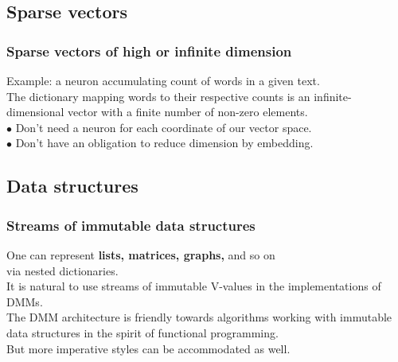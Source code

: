 \documentclass{beamer}
\newcommand{\msmagenta}[1]{{\color{mymagenta} #1}}
\begin{document}
\subsection{Sparse vectors}



\begin{frame}

  \frametitle{Sparse vectors of high or infinite dimension}

Example:  a neuron accumulating count of words in a given text.\\[2ex]

The dictionary mapping words to their respective counts is an infinite-dimensional vector
with a finite number of non-zero elements.\\[2ex]

\msmagenta{\Large $\bullet$} Don't need a neuron for each coordinate of our vector space.\\[2ex]

 \msmagenta{\Large $\bullet$} Don't have an obligation to reduce dimension by embedding.

\end{frame}





\subsection{Data structures}





\begin{frame}

  \frametitle{Streams of immutable \msmagenta{data structures}}

One can represent {\bf lists, matrices, graphs,} and so on\\ via nested dictionaries.\\[3ex]


It is natural to use streams of immutable V-values in the implementations of DMMs.\\[3ex]

The DMM architecture is friendly towards algorithms working with immutable data structures in
the spirit of functional programming.\\[3ex]

But more imperative styles can be accommodated as well.

\end{frame}
\end{document}
